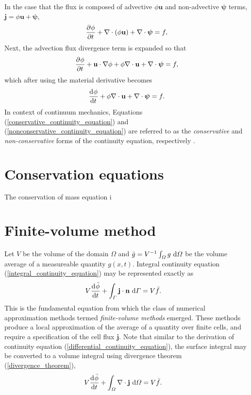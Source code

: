 In the case that the flux is composed of advective $\phi \mathbf{u}$ and non-advective $\bm{\psi}$ terms, \ie $\mathbf{j} = \phi \mathbf{u} + \bm{\psi}$, 
\begin{align}
  \label{conservative_continuity_equation}
  \frac{\partial^{} \phi}{\partial t^{} } + \nabla \cdot \left( \phi \mathbf{u} \right) + \nabla \cdot \bm{\psi} = f,
\end{align}
Next, the advection flux divergence term is expanded so that
\begin{align*}
  \frac{\partial^{} \phi}{\partial t^{} } + \mathbf{u} \cdot \nabla \phi + \phi \nabla \cdot \mathbf{u} + \nabla \cdot \bm{\psi} = f,
\end{align*}
which after using the material derivative becomes
\begin{align}
  \label{nonconservative_continuity_equation}
  \frac{\mathrm{d}^{} \phi}{\mathrm{d} t^{} } + \phi \nabla \cdot \mathbf{u} + \nabla \cdot \bm{\psi} = f.
\end{align}
In context of continuum mechanics, Equations (\ref{conservative_continuity_equation}) and (\ref{nonconservative_continuity_equation}) are referred to as the \emph{conservative} and \emph{non-conservative} forms of the continuity equation, respectively \citep{anderson_1995}.

\section{Conservation equations} \label{ssn_conservation_equations}

The conservation of mass equation i

\section{Finite-volume method} \label{ssn_finite_volume_method}

Let $V$ be the volume of the domain $\Omega$ and $\bar{g} = V^{-1} \int_{\varOmega} g \ \mathrm{d}\varOmega$ be the volume average of a measureable quantity $g(x,t)$.  Integral continuity equation (\ref{integral_continuity_equation}) may be represented exactly as
\begin{align}
  \label{finite_volume_continuity}
  V \frac{\mathrm{d}^{} \bar{\phi}}{\mathrm{d} t^{} } + \int_{\varGamma} \mathbf{j} \cdot \mathbf{n} \ \mathrm{d}\varGamma &= V \bar{f}.
\end{align}
This is the fundamental equation from which the class of numerical approximation methods termed \emph{finite-volume methods} emerged.  These methods produce a local approximation of the average of a quantity over finite cells, and require a specification of the cell flux $\mathbf{j}$.  Note that similar to the derivation of continuity equation (\ref{differential_continuity_equation}), the surface integral may be converted to a volume integral using divergence theorem (\ref{divergence_theorem}),
\begin{align}
  \label{finite_volume_continuity}
  V \frac{\mathrm{d}^{} \bar{\phi}}{\mathrm{d} t^{} } + \int_{\varOmega} \nabla \cdot \mathbf{j} \ \mathrm{d}\varOmega &= V \bar{f}.
\end{align}
